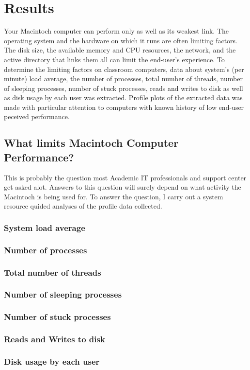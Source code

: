 \section{Results}
\label{results}
Your Macintoch computer can perform only as well as its weakest link. The 
operating system and the hardware on which it runs are often limiting factors.
The disk size, the available memory and CPU resources, the network, and the 
active directory that links them all can limit the end-user's experience. 
To determine the limiting factors on classroom computers, data about system's 
(per minute) load average, the number of processes, total number of 
threads, number of sleeping processes, number of stuck processes, reads and 
writes to disk as well as disk usage by each user was extracted. Profile 
plots of the extracted data was made with particular attention to computers 
with known history of low end-user peceived performance.
 

\subsection{What limits Macintoch Computer Performance?}
This is probably the question most Academic IT professionals and support 
center get asked alot. Answers to this question will surely depend on what 
activity the Macintoch is being used for. To answer the question, I carry out 
a system resource quided analyses of the profile data collected.

\subsubsection{System load average }

\subsubsection{Number of processes}

\subsubsection{Total number of threads}

\subsubsection{Number of sleeping processes}

\subsubsection{Number of stuck processes}

\subsubsection{Reads and Writes to disk}
 

\subsubsection{Disk usage by each user}
